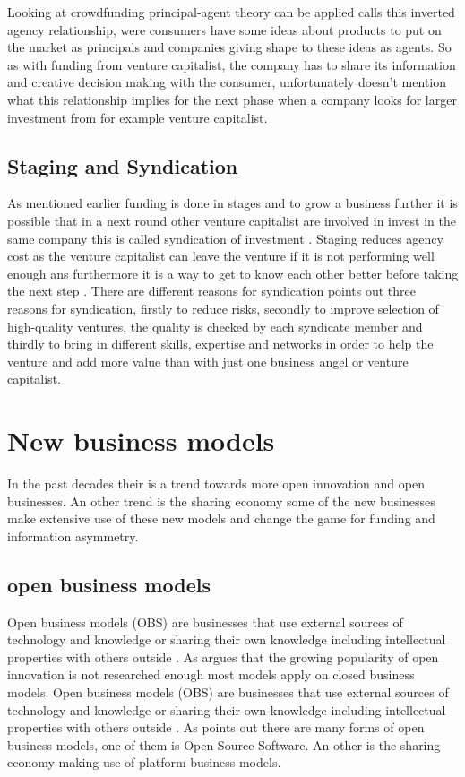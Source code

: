 \documentclass[a4paper, 11pt]{article}
\begin{document}
Looking at crowdfunding principal-agent theory can be applied \citep{chaney} calls this inverted agency relationship, were consumers have some ideas about products to put on the market as principals and companies giving shape to these ideas as agents. So as with funding from venture capitalist, the company has to share its information and creative decision making with the consumer, \citep{chaney} unfortunately doesn't mention what this relationship implies for the next phase when a company looks for larger investment from for example venture capitalist.


\subsection{Staging and Syndication}
As mentioned earlier funding is done in stages and to grow a business further it is possible that in a next round other venture capitalist are involved in invest in the same company this is called syndication of investment \citep{casson2008oxford}. Staging reduces agency cost as the venture capitalist can leave the venture if it is not performing well enough ans furthermore it is a way to get to know each other better before taking the next step \citep{colombo2016open}. There are different reasons for syndication  \cite{colombo2016open} points out three reasons for syndication, firstly to reduce risks, secondly to improve selection of high-quality ventures, the quality is checked by each syndicate member and thirdly to bring in different skills, expertise and networks in order to help the venture and add more value than with just one business angel or venture capitalist.


\section{New business models}
In the past decades their is a trend towards more open innovation and open businesses. An other trend is the sharing economy some of the new businesses make extensive use of these new models and change the game for funding and information asymmetry.

\subsection{open business models}

Open business models (OBS) are businesses that use external sources of technology and knowledge or sharing their own knowledge including intellectual properties with others outside \citep{chesbrough2007companies}.
As \cite{colombo2016open} argues that the growing popularity of open innovation is not researched enough most models apply on closed business models. Open business models (OBS) are businesses that use external sources of technology and knowledge or sharing their own knowledge including intellectual properties with others outside \citep{chesbrough2007companies}. As \cite{colombo2016open} points out there are many forms of open business models, one of them is Open Source Software. An other is the sharing economy making use of platform business models.
\end{document}
